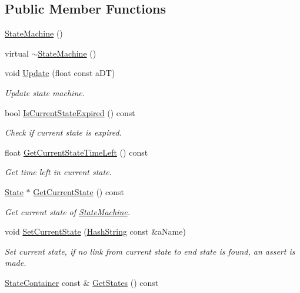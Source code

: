 \subsection*{Public Member Functions}
\begin{DoxyCompactItemize}
\item 
\hyperlink{classStateMachine_a2fb07002510ea9141019559750acfab8}{State\+Machine} ()
\item 
virtual \hyperlink{classStateMachine_a93d66cb2a89b186789d655a08b02674e}{$\sim$\+State\+Machine} ()
\item 
void \hyperlink{classStateMachine_a3f4b163017814b609805c3606b4bee78}{Update} (float const a\+DT)
\begin{DoxyCompactList}\small\item\em Update state machine. \end{DoxyCompactList}\item 
bool \hyperlink{classStateMachine_a431367848414ebb4ef202d5a74d0b67a}{Is\+Current\+State\+Expired} () const 
\begin{DoxyCompactList}\small\item\em Check if current state is expired. \end{DoxyCompactList}\item 
float \hyperlink{classStateMachine_a83cdee5a9323ddb03d29ecdbceb6e423}{Get\+Current\+State\+Time\+Left} () const 
\begin{DoxyCompactList}\small\item\em Get time left in current state. \end{DoxyCompactList}\item 
\hyperlink{classState}{State} $\ast$ \hyperlink{classStateMachine_a10cea5411c973c0f03930fd5b04c24d0}{Get\+Current\+State} () const 
\begin{DoxyCompactList}\small\item\em Get current state of \hyperlink{classStateMachine}{State\+Machine}. \end{DoxyCompactList}\item 
void \hyperlink{classStateMachine_a151285f8b089fe8329dcdaabe0322781}{Set\+Current\+State} (\hyperlink{classHashString}{Hash\+String} const \&a\+Name)
\begin{DoxyCompactList}\small\item\em Set current state, if no link from current state to end state is found, an assert is made. \end{DoxyCompactList}\item 
\hyperlink{classStateMachine_aa74dc6c024af439e701f6d97cfa4c8b8}{State\+Container} const \& \hyperlink{classStateMachine_a9740b73b4e23cc9fcdc41ad34cb62d3a}{Get\+States} () const 

\end{DoxyCompactItemize}
